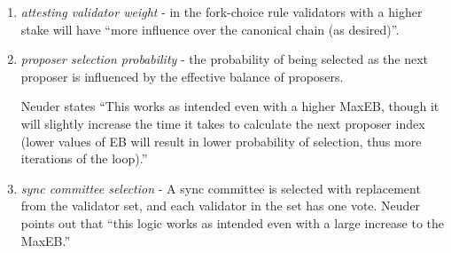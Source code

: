 \documentclass{article}
\begin{document}
\begin{enumerate}
  \item \textit{attesting validator weight } - in the fork-choice rule
    validators with a higher stake will have ``more influence over the
    canonical chain (as desired)''. 
  \item \textit{proposer selection probability} - the probability of being
    selected as the next proposer is influenced by the effective balance of
    proposers. 

    Neuder states ``This works as intended even with a higher MaxEB, though it
    will slightly increase the time it takes to calculate the next proposer
    index (lower values of EB will result in lower probability of selection,
    thus more iterations of the loop).'' 
     

  \item \textit{sync committee selection} - A sync committee is selected with
    replacement from the validator set, and each validator in the set has one
    vote. Neuder points out that ``this logic works as intended even with a
    large increase to the MaxEB.''  
\end{enumerate}
\end{document}
